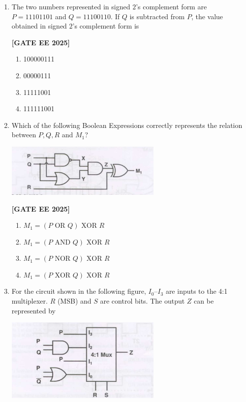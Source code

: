 \documentclass[12pt]{article}
\begin{document}
\begin{enumerate}[leftmargin=*, label=\textbf{Q.\arabic*:}]
\item The two numbers represented in signed $2$'s complement form are \\
$P=11101101$ and $Q=11100110$. If $Q$ is subtracted from $P$, the value obtained in signed $2$'s complement form is
 
\noindent \textbf{[GATE EE 2025]}
\begin{enumerate}[label=(\Alph*)]
    \item 100000111
    \item 00000111
    \item 11111001
    \item 111111001
\end{enumerate}

\item Which of the following Boolean Expressions correctly represents the relation between $P, Q, R$ and $M_1$?
\begin{center}
\includegraphics[width=0.6\textwidth]{figs/q57.png}
\end{center}
 
\noindent \textbf{[GATE EE 2025]}
\begin{enumerate}[label=(\Alph*)]
  \item $M_1 = (P \text{ OR } Q) \text{ XOR } R$
  \item $M_1 = (P \text{ AND } Q) \text{ XOR } R$
  \item $M_1 = (P \text{ NOR } Q) \text{ XOR } R$
  \item $M_1 = (P \text{ XOR } Q) \text{ XOR } R$
\end{enumerate}

\item For the circuit shown in the following figure, $I_0$–$I_3$ are inputs to the 4:1 multiplexer. $R$ (MSB) and $S$ are control bits. The output $Z$ can be represented by
\begin{center}
\includegraphics[width=0.6\textwidth]{figs/q58.png}
\end{center}
 

\end{enumerate}
\end{document}
